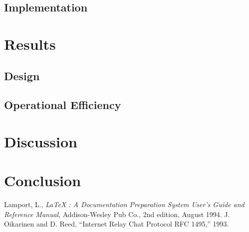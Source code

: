 \subsection{Implementation}

\section{Results}
\subsection{Design}
\subsection{Operational Efficiency}
\subsection{}

\section{Discussion}

\section{Conclusion}

\begin{thebibliography}{99}
 Lamport, L., {\it LaTeX : A Documentation
 Preparation System User's Guide and Reference Manual}, Addison-Wesley 
 Pub Co., 2nd edition, August 1994.
 J. Oikarinen and D. Reed, “Internet Relay Chat Protocol
RFC 1495,” 1993.
\end{thebibliography}
 


